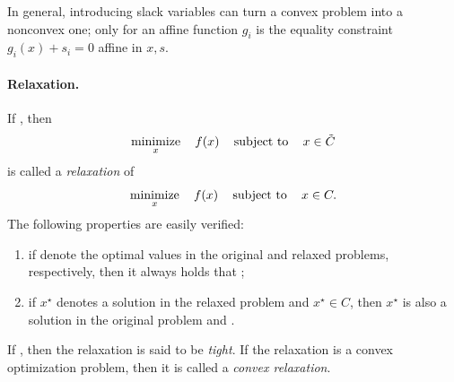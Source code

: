 In general, introducing slack variables can turn a convex problem into a
nonconvex one; only for an affine function $g_i$ is the equality constraint
$g_i(x) + s_i = 0$ affine in $x,s$.       

\paragraph{Relaxation.} 

If , then 
\[
\operatorname*{minimize}_x \quad f(x) \quad \operatorname{subject\,\,to} \quad x \in \tilde{C}
\]
is called a \emph{relaxation} of 
\[
\operatorname*{minimize}_x \quad f(x) \quad \operatorname{subject\,\,to} \quad x \in C.
\]
The following properties are easily verified: 
\begin{enumerate}[label=(\roman*)]
\item if  denote the optimal values in 
  the original and relaxed problems, respectively, then it always holds that 
  ;  
\item if $x^\star$ denotes a solution in the relaxed problem and $x^\star \in
  C$, then $x^\star$ is also a solution in the original problem and
  . 
\end{enumerate}
If , then the relaxation is said to be 
\emph{tight}. If the relaxation is a convex optimization problem, then it is
called a \emph{convex relaxation}. 


